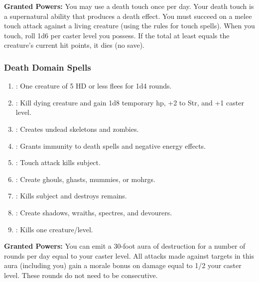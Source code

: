 \textbf{Granted Powers:} You may use a death touch once per day. Your death touch is a supernatural ability that produces a death effect. You must succeed on a melee touch attack against a living creature (using the rules for touch spells). When you touch, roll 1d6 per caster level you possess. If the total at least equals the creature’s current hit points, it dies (no save).
\subsubsection{Death Domain Spells}
\begin{enumerate}
	\item{:} One creature of 5 HD or less flees for 1d4 rounds.
	\item{:} Kill dying creature and gain 1d8 temporary hp, +2 to Str, and +1 caster level.
	\item{:} Creates undead skeletons and zombies.
	\item{:} Grants immunity to death spells and negative energy effects.
	\item{:} Touch attack kills subject.
	\item{:} Create ghouls, ghasts, mummies, or mohrgs.
	\item{:} Kills subject and destroys remains.
	\item{:} Create shadows, wraiths, spectres, and devourers.
	\item{:} Kills one creature/level.
\end{enumerate}

\textbf{Granted Powers:} You can emit a 30-foot aura of destruction for a number of rounds per day equal to your caster level. All attacks made against targets in this aura (including you) gain a morale bonus on damage equal to 1/2 your caster level. These rounds do not need to be consecutive.
